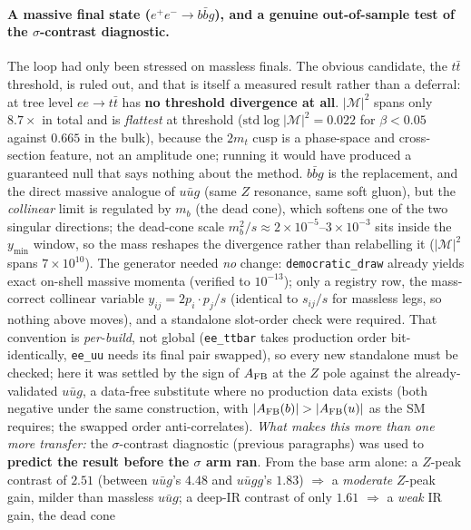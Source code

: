 \documentclass[11pt]{article}
\newcommand{\code}[1]{\texttt{#1}}
\begin{document}
\paragraph{A massive final state ($e^+e^-\to b\bar b g$), and a genuine out-of-sample test of the
$\sigma$-contrast diagnostic.} The loop had only been stressed on massless finals. The obvious
candidate, the $t\bar t$ threshold, is ruled out, and that is itself a measured result rather than a
deferral: at tree level $ee\to t\bar t$ has \textbf{no threshold divergence at all}. $|\mathcal M|^2$
spans only $8.7\times$ in total and is \emph{flattest} at threshold ($\mathrm{std}\log|\mathcal M|^2
= 0.022$ for $\beta<0.05$ against $0.665$ in the bulk), because the $2m_t$ cusp is a phase-space and
cross-section feature, not an amplitude one; running it would have produced a guaranteed null that
says nothing about the method. $b\bar b g$ is the replacement, and the direct
massive analogue of $u\bar u g$ (same $Z$ resonance, same soft gluon), but the \emph{collinear}
limit is regulated by $m_b$ (the dead cone), which softens one of the two singular directions; the
dead-cone scale $m_b^2/s\!\approx\!2\times10^{-5}$--$3\times10^{-3}$ sits inside the $y_{\min}$ window,
so the mass reshapes the divergence rather than relabelling it ($|\mathcal M|^2$ spans $7\times10^{10}$).
The generator needed \emph{no} change: \code{democratic\_draw} already yields exact on-shell massive
momenta (verified to $10^{-13}$); only a registry row, the mass-correct collinear variable
$y_{ij}=2p_i\!\cdot\!p_j/s$ (identical to $s_{ij}/s$ for massless legs, so nothing above moves), and a
standalone slot-order check were required. That convention is \emph{per-build}, not global
(\code{ee\_ttbar} takes production order bit-identically, \code{ee\_uu} needs its final pair
swapped), so every new standalone must be checked; here it was settled by the sign
of $A_{\rm FB}$ at the $Z$ pole against the already-validated $u\bar u g$, a data-free substitute where
no production data exists (both negative under the same construction, with $|A_{\rm FB}(b)|>|A_{\rm
FB}(u)|$ as the SM requires; the swapped order anti-correlates). \emph{What makes this more than one
more transfer:} the $\sigma$-contrast diagnostic (previous paragraphs) was used to \textbf{predict the
result before the $\sigma$ arm ran}. From the base arm alone: a $Z$-peak contrast of $2.51$ (between
$u\bar u g$'s $4.48$ and $u\bar u gg$'s $1.83$) $\Rightarrow$ a \emph{moderate} $Z$-peak gain, milder than
massless $u\bar u g$; a deep-IR contrast of only $1.61$ $\Rightarrow$ a \emph{weak} IR gain, the dead cone
\end{document}
